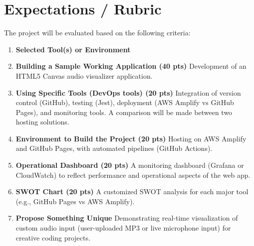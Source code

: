\section*{Expectations / Rubric}
The project will be evaluated based on the following criteria:

\begin{enumerate}
    \item \textbf{Selected Tool(s) or Environment} 
    \item \textbf{Building a Sample Working Application (40 pts)}  
    Development of an HTML5 Canvas audio visualizer application.
    
    \item \textbf{Using Specific Tools (DevOps tools) (20 pts)}  
    Integration of version control (GitHub), testing (Jest), deployment (AWS Amplify vs GitHub Pages), and monitoring tools. A comparison will be made between two hosting solutions.
    
    \item \textbf{Environment to Build the Project (20 pts)}  
    Hosting on AWS Amplify and GitHub Pages, with automated pipelines (GitHub Actions).
    
    \item \textbf{Operational Dashboard (20 pts)}  
    A monitoring dashboard (Grafana or CloudWatch) to reflect performance and operational aspects of the web app.
    
    \item \textbf{SWOT Chart (20 pts)}  
    A customized SWOT analysis for each major tool (e.g., GitHub Pages vs AWS Amplify).
    
    \item \textbf{Propose Something Unique}  
    Demonstrating real-time visualization of custom audio input (user-uploaded MP3 or live microphone input) for creative coding projects.
\end{enumerate}
